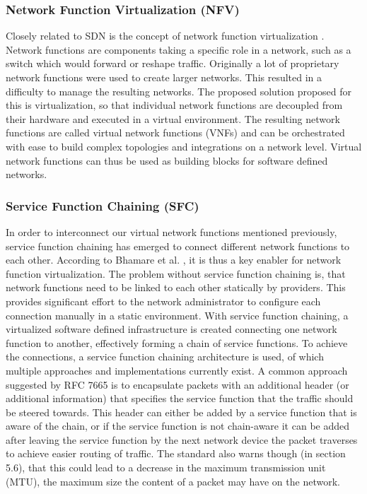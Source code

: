 \documentclass{article}
\begin{document}
\subsubsection{Network Function Virtualization (NFV)}
Closely related to SDN is the concept of network function virtualization \cite{nfv}. Network functions are components taking a specific role in a network, such as a switch which would forward or reshape traffic. Originally a lot of proprietary network functions were used to create larger networks. This resulted in a difficulty to manage the resulting networks. The proposed solution proposed for this is virtualization, so that individual network functions are decoupled from their hardware and executed in a virtual environment. The resulting network functions are called virtual network functions (VNFs) and can be orchestrated with ease to build complex topologies and integrations on a network level. Virtual network functions can thus be used as building blocks for software defined networks.

\subsubsection{Service Function Chaining (SFC)}
In order to interconnect our virtual network functions mentioned previously, service function chaining \cite{sfc} has emerged to connect different network functions to each other. According to Bhamare et al. \cite{sfc}, it is thus a key enabler for network function virtualization. The problem without service function chaining is, that network functions need to be linked to each other statically by providers. This provides significant effort to the network administrator to configure each connection manually in a static environment. With service function chaining, a virtualized software defined infrastructure is created connecting one network function to another, effectively forming a chain of service functions. To achieve the connections, a service function chaining architecture is used, of which multiple approaches and implementations currently exist. A common approach suggested by RFC 7665 \cite{rfc7665} is to encapsulate packets with an additional header (or additional information) that specifies the service function that the traffic should be steered towards. This header can either be added by a service function that is aware of the chain, or if the service function is not chain-aware it can be added after leaving the service function by the next network device the packet traverses to achieve easier routing of traffic. The standard also warns though (in section 5.6), that this could lead to a decrease in the maximum transmission unit (MTU), the maximum size the content of a packet may have on the network.
\end{document}
